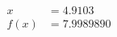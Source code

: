 \documentclass[preview]{standalone}
\begin{document}
\begin{align*}
x &= 4.9103\\f(x) &= 7.9989890
\end{align*}
\end{document}
